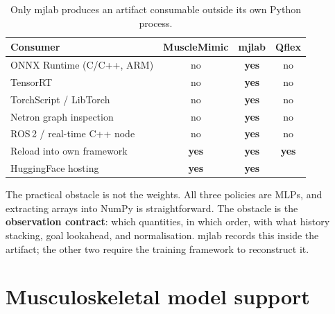 \documentclass[11pt,a4paper]{article}
\newcommand{\yes}{\textbf{yes}}
\newcommand{\no}{no}
\newcommand{\na}{\textemdash}
\begin{document}
\begin{table}[h!]
\centering
\small
\begin{tabular}{@{}lccc@{}}
\toprule
Consumer & \textcolor{mmC}{MuscleMimic} & \textcolor{mjC}{mjlab} & \textcolor{qfC}{Qflex} \\
\midrule
ONNX Runtime (C/C++, ARM)      & \no & \yes & \no \\
TensorRT                        & \no & \yes & \no \\
TorchScript / LibTorch          & \no & \yes & \no \\
Netron graph inspection         & \no & \yes & \no \\
ROS\,2 / real-time C++ node     & \no & \yes & \no \\
Reload into own framework       & \yes & \yes & \yes \\
HuggingFace hosting             & \yes & \yes & \na \\
\bottomrule
\end{tabular}
\caption{Only mjlab produces an artifact consumable outside its own Python process.}
\end{table}

\noindent
The practical obstacle is not the weights. All three policies are MLPs, and extracting
arrays into NumPy is straightforward. The obstacle is the \textbf{observation contract}:
which quantities, in which order, with what history stacking, goal lookahead, and
normalisation. mjlab records this inside the artifact; the other two require the training
framework to reconstruct it.

\section{Musculoskeletal model support}
\label{sec:msk}
\end{document}
